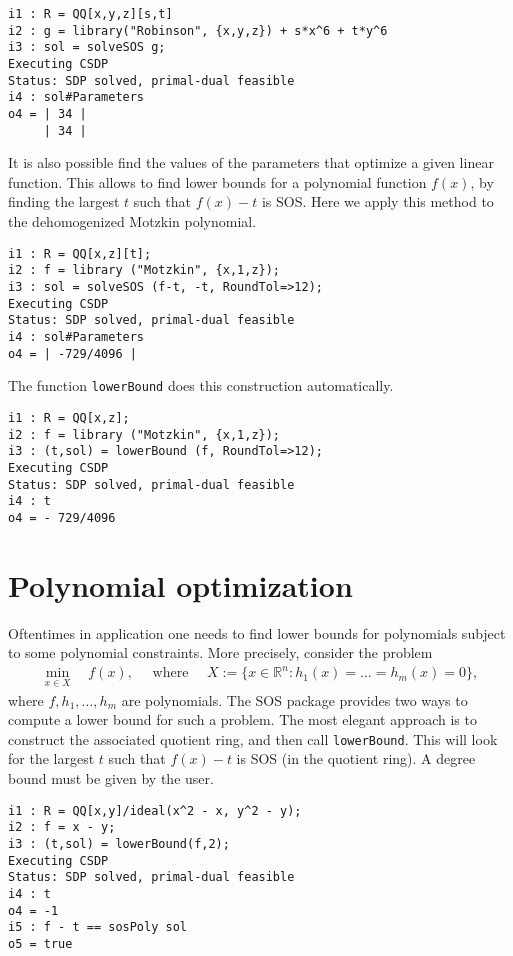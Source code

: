 \documentclass[11pt]{amsart}
\theoremstyle{plain}%
\theoremstyle{definition}
\theoremstyle{remark}
\newcommand{\SOS}{\textsc{SOS}\xspace}
\newcommand{\RR}{\mathbb{R}}
\begin{document}
{\small
\begin{verbatim}
i1 : R = QQ[x,y,z][s,t]
i2 : g = library("Robinson", {x,y,z}) + s*x^6 + t*y^6
i3 : sol = solveSOS g;
Executing CSDP
Status: SDP solved, primal-dual feasible
i4 : sol#Parameters
o4 = | 34 |
     | 34 |
\end{verbatim}
}

It is also possible find the values of the parameters that optimize a given linear function.
This allows to find lower bounds for a polynomial function $f(x)$,
by finding the largest $t$ such that $f(x)-t$ is SOS.
Here we apply this method to the dehomogenized Motzkin polynomial.

{\small
\begin{verbatim}
i1 : R = QQ[x,z][t];
i2 : f = library ("Motzkin", {x,1,z});
i3 : sol = solveSOS (f-t, -t, RoundTol=>12);
Executing CSDP
Status: SDP solved, primal-dual feasible
i4 : sol#Parameters
o4 = | -729/4096 |
\end{verbatim}
}

\noindent
The function \verb|lowerBound| does this construction automatically.
{\small
\begin{verbatim}
i1 : R = QQ[x,z];
i2 : f = library ("Motzkin", {x,1,z});
i3 : (t,sol) = lowerBound (f, RoundTol=>12);
Executing CSDP
Status: SDP solved, primal-dual feasible
i4 : t
o4 = - 729/4096
\end{verbatim}
}

\section{Polynomial optimization}

Oftentimes in application one needs to find lower bounds for polynomials subject to some polynomial constraints.
More precisely, consider the problem
\begin{align*}
  \min_{x\in X} \quad f(x),
  \quad \text{ where }\quad
  X := \{x \in \RR^n : h_1(x)=\dots=h_m(x)=0\},
\end{align*}
where $f, h_1,\dots,h_m$ are polynomials.
The \SOS package provides two ways to compute a lower bound for such a problem.
The most elegant approach is to construct the associated quotient ring, and then call \verb|lowerBound|.
This will look for the largest $t$ such that $f(x)-t$ is SOS (in the quotient ring).
A degree bound must be given by the user.

{\small
\begin{verbatim}
i1 : R = QQ[x,y]/ideal(x^2 - x, y^2 - y);
i2 : f = x - y;
i3 : (t,sol) = lowerBound(f,2);
Executing CSDP
Status: SDP solved, primal-dual feasible
i4 : t
o4 = -1
i5 : f - t == sosPoly sol
o5 = true
\end{verbatim}
}
\end{document}
